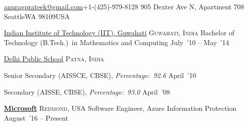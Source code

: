 \documentclass[10pt,a4paper]{article}
\begin{document}
\sloppy  %



\nobreakvspace{0.3em}  %

\noindent\href{mailto:anuragprateek@gmail.com}{anuragprateek\mbox{}@\mbox{}gmail.com}\sbull +1-(425)-979-8128\sbull
905 Dexter Ave N, Apartment 708\sbull
Seattle\sbull WA 98109\sbull USA
\spacedhrule{0.5em}{-0.4em}


\headedsection
  {\href{}{Indian Institute of Technology (IIT), Guwahati}}
  {\textsc{Guwahati, India}} {%
  \headedsubsection
    {Bachelor of Technology (B.Tech.)~in Mathematics and Computing}
    {July~'10 -- May~'14} {}
}

\headedsection
{\href{}{Delhi Public School}}
{\textsc{Patna, India}} {%
	\headedsubsection
	{Senior Secondary (AISSCE, CBSE), \textit{Percentage:~92.6}}
	{April~'10} {}

	\headedsubsection
	{Secondary (AISSE, CBSE), \textit{Percentage:~93.0}}
	{April~'08} {}
	
}

\spacedhrule{0.5em}{-0.4em}


\headedsection  %
  {\href{}{\textbf{Microsoft}}}
  {\textsc{Redmond, USA}}
  {%
  \headedsubsection
    {Software Engineer, Azure Information Protection}
    {August~'16 -- Present}
    {}
}
\end{document}
